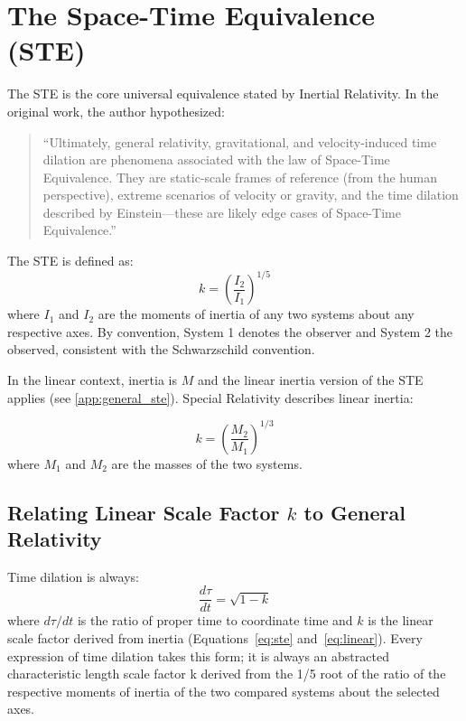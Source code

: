 \section{The Space-Time Equivalence (STE)}
The STE is the core universal equivalence stated by Inertial Relativity. In the original work\citep{degerlia202501}, the author hypothesized:
\begin{quote}
``Ultimately, general relativity, gravitational, and velocity-induced time dilation are phenomena associated with the law of Space-Time Equivalence. They are static-scale frames of reference (from the human perspective), extreme scenarios of velocity or gravity, and the time dilation described by Einstein---these are likely edge cases of Space-Time Equivalence.''
\end{quote}
The STE is defined as:
\begin{equation} \label{eq:ste}
k = \left(\frac{I_2}{I_1}\right)^{1/5}
\end{equation}
where $I_1$ and $I_2$ are the moments of inertia of any two systems about any respective axes. By convention, System 1 denotes the observer and System 2 the observed, consistent with the Schwarzschild convention.

In the linear context, inertia is $M$ and the linear inertia version of the STE applies (see \ref{app:general_ste}). Special Relativity describes linear inertia:

\begin{equation} \label{eq:linear}
k = \left(\frac{M_2}{M_1}\right)^{1/3}
\end{equation}
where $M_1$ and $M_2$ are the masses of the two systems.

\subsection{Relating Linear Scale Factor $k$ to General Relativity}
Time dilation is always:
\begin{equation} \label{eq:td_k}
\frac{d\tau}{dt} = \sqrt{1 - k}
\end{equation}
where $d\tau/dt$ is the ratio of proper time to coordinate time and $k$ is the linear scale factor derived from inertia (Equations~\ref{eq:ste} and~\ref{eq:linear}). Every expression of time dilation takes this form; it is always an abstracted characteristic length scale factor k derived from the 1/5 root of the ratio of the respective moments of inertia of the two compared systems about the selected axes.

